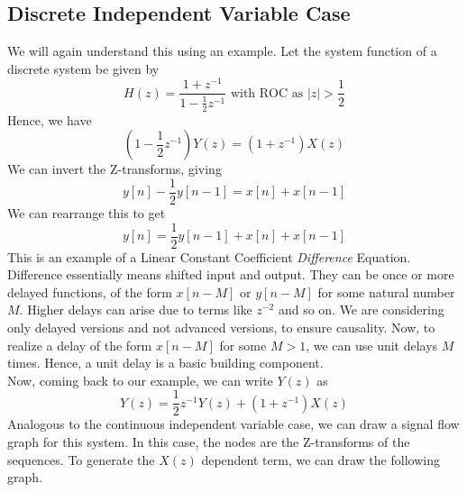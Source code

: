 \subsection{Discrete Independent Variable Case}
We will again understand this using an example. Let the system function of a discrete system be given by
\[
H(z) = 	\frac{1+z^{-1}}{1-\frac{1}{2}z^{-1}} \text{ with ROC as } |z|>\frac{1}{2}
\]
Hence, we have
\[
(1-\frac{1}{2}z^{-1})Y(z) = (1+z^{-1})X(z)
\]
We can invert the Z-transforms, giving
\[
y[n]-\frac{1}{2}y[n-1] = x[n]+x[n-1]
\]
We can rearrange this to get
\[
y[n]=\frac{1}{2}y[n-1] + x[n]+x[n-1]
\]
This is an example of a Linear Constant Coefficient \emph{Difference} Equation. Difference essentially means shifted input and output. They can be once or more delayed functions, of the form $x[n-M]$ or $y[n-M]$ for some natural number $M$. Higher delays can arise due to terms like $z^{-2}$ and so on. We are considering only delayed versions and not advanced versions, to ensure causality. Now, to realize a delay of the form $x[n-M]$ for some $M>1$, we can use unit delays $M$ times. Hence, a unit delay is a basic building component.\\
Now, coming back to our example, we can write $Y(z)$ as
\[
Y(z) = \frac{1}{2}z^{-1}Y(z)+(1+z^{-1})X(z)
\]
Analogous to the continuous independent variable case, we can draw a signal flow graph for this system. In this case, the nodes are the Z-transforms of the sequences. To generate the $X(z)$ dependent term, we can draw the following graph.
\begin{center}
\end{center}
